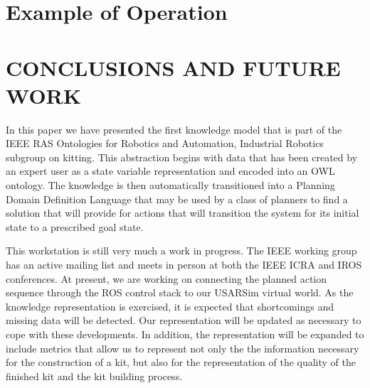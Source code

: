 \section{Example of Operation}
\label{sect:Example}



\addtolength{\textheight}{-15cm}   %


\section{CONCLUSIONS AND FUTURE WORK}
\label{sect:Conclusions}
In this paper we have presented the first knowledge model that is part of the IEEE RAS Ontologies for Robotics and Automation, Industrial Robotics subgroup on kitting.
This abstraction begins with data that has been created by an expert user as a state variable representation and encoded into an OWL ontology. The knowledge
is then automatically transitioned into a Planning Domain Definition Language that may be used by a class of planners to find a solution that will provide for actions that will
transition the system for its initial state to a prescribed goal state.

This workstation is still very much a work in progress. The IEEE working group has an active mailing list and meets in person at both the IEEE ICRA and IROS conferences.
At present, we are working on connecting the planned action sequence through the ROS control stack to our USARSim virtual world. As the knowledge representation is
exercised, it is expected that shortcomings and missing data will be detected. Our representation will be updated as necessary to cope with these developments. In addition,
the representation will be expanded to include metrics that allow us to represent not only the the information necessary for the construction of a kit, but also for the representation
of the quality of the finished kit and the kit building process.




